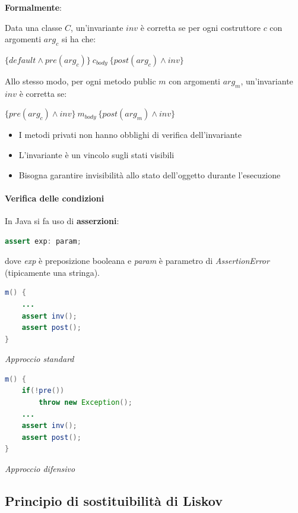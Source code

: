 \newpage

\textbf{Formalmente}:

Data una classe $C$, un'invariante $inv$ è corretta se per ogni costruttore $c$ con argomenti $arg_c$ si ha che:
\begin{center}
    $\{default \land pre(arg_c)\}\ c_{body}\ \{post(arg_c) \land inv\}$
\end{center}
Allo stesso modo, per ogni metodo public $m$ con argomenti $arg_m$, un'invariante $inv$ è corretta se:
\begin{center}
    $\{pre(arg_c) \land inv\}\ m_{body}\ \{post(arg_m) \land inv\}$
\end{center}
\begin{itemize}
    \item I metodi privati non hanno obblighi di verifica dell'invariante
    \item L'invariante è un vincolo sugli stati visibili
    \item Bisogna garantire invisibilità allo stato dell'oggetto durante l'esecuzione
\end{itemize}

\paragraph{Verifica delle condizioni} In Java si fa uso di \textbf{asserzioni}:
\begin{center}
    \begin{lstlisting}[language=Java]
    assert exp: param;    
    \end{lstlisting}
\end{center}
dove \textit{exp} è preposizione booleana e \textit{param} è parametro di \textit{AssertionError} (tipicamente una stringa).

\begin{multicols}{2}
\begin{lstlisting}[language=Java]
m() { 
    ...
    assert inv();
    assert post(); 
}    
\end{lstlisting}
\textit{Approccio standard}
\columnbreak
\begin{lstlisting}[language=Java]
m() {
    if(!pre())
        throw new Exception();
    ...
    assert inv(); 
    assert post(); 
}
\end{lstlisting}
\textit{Approccio difensivo}
\end{multicols}


\subsection{Principio di sostituibilità di Liskov}
\label{liskov}

